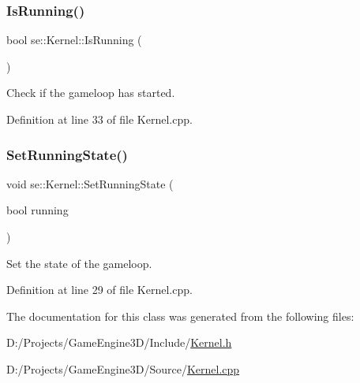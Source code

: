 \subsubsection{\texorpdfstring{Is\+Running()}{IsRunning()}}
{\footnotesize\ttfamily bool se\+::\+Kernel\+::\+Is\+Running (\begin{DoxyParamCaption}{ }\end{DoxyParamCaption})}

Check if the gameloop has started. 

Definition at line 33 of file Kernel.\+cpp.

\mbox{\label{classse_1_1_kernel_a66bc4af7514718abbfc307c2381f5327}} 
\subsubsection{\texorpdfstring{Set\+Running\+State()}{SetRunningState()}}
{\footnotesize\ttfamily void se\+::\+Kernel\+::\+Set\+Running\+State (\begin{DoxyParamCaption}\item[{bool}]{running }\end{DoxyParamCaption})}

Set the state of the gameloop. 

Definition at line 29 of file Kernel.\+cpp.



The documentation for this class was generated from the following files\+:\begin{DoxyCompactItemize}
\item 
D\+:/\+Projects/\+Game\+Engine3\+D/\+Include/\mbox{\hyperlink{_kernel_8h}{Kernel.\+h}}\item 
D\+:/\+Projects/\+Game\+Engine3\+D/\+Source/\mbox{\hyperlink{_kernel_8cpp}{Kernel.\+cpp}}\end{DoxyCompactItemize}
